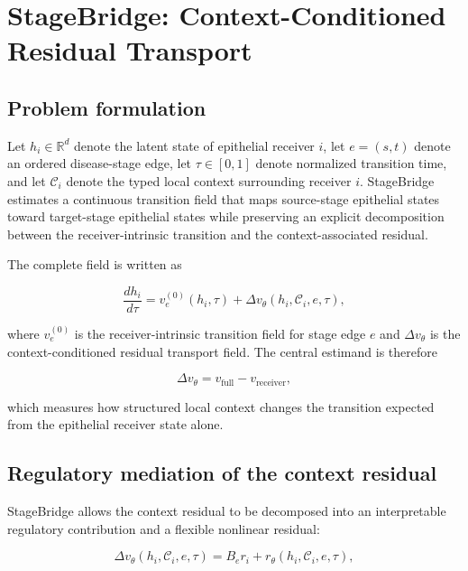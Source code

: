\chapter{StageBridge: Context-Conditioned Residual Transport} \label{chap:methods}

\section{Problem formulation}

Let $h_i\in\mathbb{R}^{d}$ denote the latent state of epithelial receiver $i$, let $e=(s,t)$ denote an ordered disease-stage edge, let $\tau\in[0,1]$ denote normalized transition time, and let $\mathcal{C}_i$ denote the typed local context surrounding receiver $i$. StageBridge estimates a continuous transition field that maps source-stage epithelial states toward target-stage epithelial states while preserving an explicit decomposition between the receiver-intrinsic transition and the context-associated residual.

The complete field is written as

\begin{equation}
\frac{d h_i}{d\tau}
=
v_{e}^{(0)}(h_i,\tau)
+
\Delta v_{\theta}(h_i,\mathcal{C}_i,e,\tau),
\label{eq:ccrt-core}
\end{equation}

where $v_{e}^{(0)}$ is the receiver-intrinsic transition field for stage edge $e$ and $\Delta v_{\theta}$ is the context-conditioned residual transport field. The central estimand is therefore

\begin{equation}
\Delta v_{\theta}
=
v_{\mathrm{full}}-v_{\mathrm{receiver}},
\label{eq:context-residual}
\end{equation}

which measures how structured local context changes the transition expected from the epithelial receiver state alone.

\section{Regulatory mediation of the context residual}

StageBridge allows the context residual to be decomposed into an interpretable regulatory contribution and a flexible nonlinear residual:

\begin{equation}
\Delta v_{\theta}(h_i,\mathcal{C}_i,e,\tau)
=
B_e r_i
+
r_{\theta}(h_i,\mathcal{C}_i,e,\tau),
\label{eq:regulatory-residual}
\end{equation}

